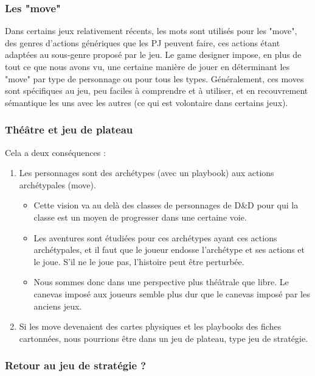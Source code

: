 \documentclass[a4paper, 11pt, twoside]{article}
\begin{document}
\subsubsection{Les "move"}
\label{sec:orgfaacee8}

Dans certains jeux relativement récents, les mots sont utilisés pour les "move", des genres d'actions génériques que les PJ peuvent faire, ces actions étant adaptées au sous-genre proposé par le jeu. Le game designer impose, en plus de tout ce que nous avons vu, une certaine manière de jouer en déterminant les "move" par type de personnage ou pour tous les types. Généralement, ces moves sont spécifiques au jeu, peu faciles à comprendre et à utiliser, et en recouvrement sémantique les uns avec les autres (ce qui est volontaire dans certains jeux).

\subsubsection{Théâtre et jeu de plateau}
\label{sec:orgcd8ac0b}

Cela a deux conséquences :
\begin{enumerate}
\item Les personnages sont des archétypes (avec un playbook) aux actions archétypales (move).
\begin{itemize}
\item Cette vision va au delà des classes de personnages de D\&D pour qui la classe est un moyen de progresser dans une certaine voie.
\item Les aventures sont étudiées pour ces archétypes ayant ces actions archétypales, et il faut que le joueur endosse l'archétype et ses actions et le joue. S'il ne le joue pas, l'histoire peut être perturbée.
\item Nous sommes donc dans une perspective plus théâtrale que libre. Le canevas imposé aux joueurs semble plus dur que le canevas imposé par les anciens jeux.
\end{itemize}
\item Si les move devenaient des cartes physiques et les playbooks des fiches cartonnées, nous pourrions être dans un jeu de plateau, type jeu de stratégie.
\end{enumerate}

\subsubsection{Retour au jeu de stratégie ?}
\label{sec:org41f0105}
\end{document}
